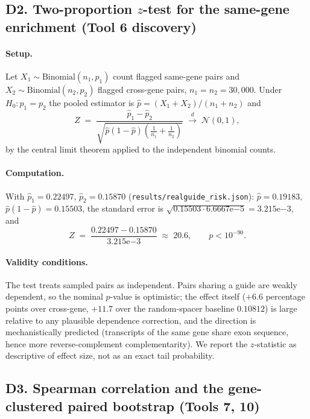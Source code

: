 \subsection{D2. Two-proportion $z$-test for the same-gene enrichment (Tool 6 discovery)}
\paragraph{Setup.} Let $X_1 \sim \text{Binomial}(n_1, p_1)$ count flagged
same-gene pairs and $X_2 \sim \text{Binomial}(n_2, p_2)$ flagged
cross-gene pairs, $n_1 = n_2 = 30{,}000$. Under $H_0: p_1 = p_2$ the
pooled estimator is $\hat{p} = (X_1 + X_2)/(n_1 + n_2)$ and
\begin{equation}
Z \;=\; \frac{\hat{p}_1 - \hat{p}_2}
{\sqrt{\hat{p}(1-\hat{p})\left(\tfrac{1}{n_1} + \tfrac{1}{n_2}\right)}}
\;\xrightarrow{d}\; \mathcal{N}(0,1),
\label{eq:ztest}
\end{equation}
by the central limit theorem applied to the independent binomial counts.
\paragraph{Computation.} With $\hat{p}_1 = 0.22497$, $\hat{p}_2 = 0.15870$
(\texttt{results/realguide\_risk.json}): $\hat{p} = 0.19183$,
$\hat{p}(1-\hat{p}) = 0.15503$, the standard error is
$\sqrt{0.15503 \cdot 6.6667\mathrm{e}{-5}} = 3.215\mathrm{e}{-3}$, and
\begin{equation}
Z \;=\; \frac{0.22497 - 0.15870}{3.215\mathrm{e}{-3}} \;\approx\; 20.6,
\qquad p < 10^{-90}.
\end{equation}
\paragraph{Validity conditions.} The test treats sampled pairs as
independent. Pairs sharing a guide are weakly dependent, so the nominal
$p$-value is optimistic; the effect itself ($+6.6$ percentage points over
cross-gene, $+11.7$ over the random-spacer baseline $0.10812$) is large
relative to any plausible dependence correction, and the direction is
mechanistically predicted (transcripts of the same gene share exon
sequence, hence more reverse-complement complementarity). We report the
$z$-statistic as descriptive of effect size, not as an exact tail
probability.

\subsection{D3. Spearman correlation and the gene-clustered paired bootstrap (Tools 7, 10)}
